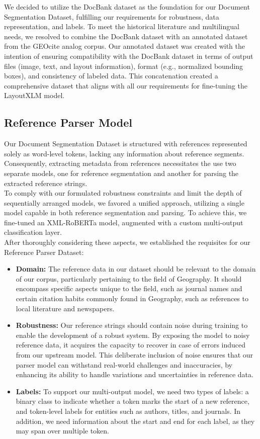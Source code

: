 We decided to utilize the DocBank dataset as the foundation for our Document Segmentation Dataset, fulfilling our requirements for robustness, data representation, and labels. To meet the historical literature and multilingual needs, we resolved to combine the DocBank dataset with an annotated dataset from the GEOcite analog corpus. Our annotated dataset was created with the intention of ensuring compatibility with the DocBank dataset in terms of output files (image, text, and layout information), format (e.g., normalized bounding boxes), and consistency of labeled data. This concatenation created a comprehensive dataset that aligns with all our requirements for fine-tuning the LayoutXLM model.

\subsection{Reference Parser Model}\label{sec:roadmap_reference_parser}
Our Document Segmentation Dataset is structured with references represented solely as word-level tokens, lacking any information about reference segments. Consequently, extracting metadata from references necessitates the use two separate models, one for reference segmentation and another for parsing the extracted reference strings.\\
To comply with our formulated robustness constraints and limit the depth of sequentially arranged models, we favored a unified approach, utilizing a single model capable in both reference segmentation and parsing. To achieve this, we fine-tuned an XML-RoBERTa model, augmented with a custom multi-output classification layer.\\
After thoroughly considering these aspects, we established the requisites for our Reference Parser Dataset:

\begin{itemize}
    \item \textbf{Domain:} The reference data in our dataset should be relevant to the domain of our corpus, particularly pertaining to the field of Geography. It should encompass specific aspects unique to the field, such as journal names and certain citation habits commonly found in Geography, such as references to local literature and newspapers.
    \item \textbf{Robustness:} Our reference strings should contain noise during training to enable the development of a robust system. By exposing the model to noisy reference data, it acquires the capacity to recover in case of errors induced from our upstream model. This deliberate inclusion of noise ensures that our parser model can withstand real-world challenges and inaccuracies, by enhancing its ability to handle variations and uncertainties in reference data.
    \item \textbf{Labels:} To support our multi-output model, we need two types of labels: a binary class to indicate whether a token marks the start of a new reference, and token-level labels for entities such as authors, titles, and journals. In addition, we need information about the start and end for each label, as they may span over multiple token.
\end{itemize}

